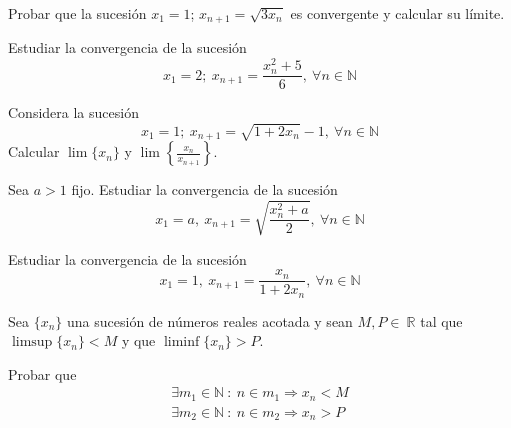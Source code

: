\begin{ejercicio}\label{ej:6.5.8}
    Probar que la sucesión $x_1 = 1$; $x_{n+1}=\sqrt{3 x_n}$ es convergente y calcular su límite.
\end{ejercicio}

\begin{ejercicio}\label{ej:6.5.9}
    Estudiar la convergencia de la sucesión
    \begin{equation*}
        x_1 = 2; ~ x_{n+1}=\frac{x_n^2+5}{6}, ~ \forall n \in \mathbb{N}
    \end{equation*}
\end{ejercicio}

\begin{ejercicio}\label{ej:6.5.10}
    Considera la sucesión
    \begin{equation*}
        x_1=1; ~ x_{n+1}=\sqrt{1+2 x_n} - 1, ~ \forall n \in \mathbb{N}
    \end{equation*}
    Calcular $\lim \{x_n\}$ y $\lim \left\{\frac{x_n}{x_{n+1}}\right\}$.
\end{ejercicio}

\begin{ejercicio}\label{ej:6.5.11}
    Sea $a > 1$ fijo. Estudiar la convergencia de la sucesión
    \begin{equation*}
        x_1=a, ~ x_{n+1}=\sqrt{\frac{x_n^2+a}{2}}, ~ \forall n \in \mathbb{N}
    \end{equation*}
\end{ejercicio}

\begin{ejercicio}\label{ej:6.5.12}
    Estudiar la convergencia de la sucesión
    \begin{equation*}
        x_1 = 1, ~ x_{n+1} = \frac{x_n}{1+ 2 x_n}, ~ \forall n \in \mathbb{N}
    \end{equation*}
\end{ejercicio}

\begin{ejercicio}\label{ej:6.5.13}
    Sea $\{x_n\}$ una sucesión de números reales acotada y sean $M,P \in~\mathbb{R}$ tal que $\limsup \{x_n\} < M$ y que $\liminf \{x_n\} > P$.

    Probar que
    \begin{gather*}
        \exists m_1 \in \mathbb{N} ~:~ n \in m_1 \Longrightarrow x_n < M\\
        \exists m_2 \in \mathbb{N} ~:~ n \in m_2 \Longrightarrow x_n > P
    \end{gather*}
\end{ejercicio}